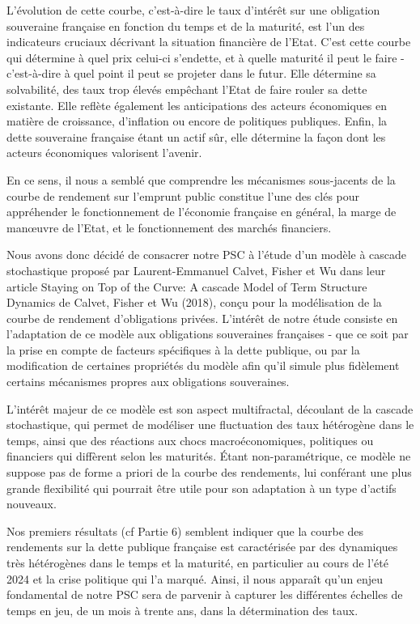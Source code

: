 \documentclass[a4paper]{article}
\begin{document}
L’évolution de cette courbe, c’est-à-dire le taux d’intérêt sur une obligation souveraine française en fonction du temps et de la maturité, est l’un des indicateurs cruciaux décrivant la situation financière de l’Etat. C’est cette courbe qui détermine à quel prix celui-ci s’endette, et à quelle maturité il peut le faire - c’est-à-dire à quel point il peut se projeter dans le futur. Elle détermine sa solvabilité, des taux trop élevés empêchant l’Etat de faire rouler sa dette existante. Elle reflète également les anticipations des acteurs économiques en matière de croissance, d’inflation ou encore de politiques publiques. Enfin, la dette souveraine française étant un actif sûr, elle détermine la façon dont les acteurs économiques valorisent l’avenir.

En ce sens, il nous a semblé que comprendre les mécanismes sous-jacents de la courbe de rendement sur l’emprunt public constitue l’une des clés pour appréhender le fonctionnement de l’économie française en général, la marge de manœuvre de l’Etat, et le fonctionnement des marchés financiers. 

Nous avons donc décidé de consacrer notre PSC à l’étude d’un modèle à cascade stochastique proposé par Laurent-Emmanuel Calvet, Fisher et Wu dans leur article Staying on Top of the Curve: A cascade Model of Term Structure Dynamics de Calvet, Fisher et Wu (2018), conçu pour la modélisation de la courbe de rendement d'obligations privées. L’intérêt de notre étude consiste en l’adaptation de ce modèle aux obligations souveraines françaises - que ce soit par la prise en compte de facteurs spécifiques à la dette publique, ou par la modification de certaines propriétés du modèle afin qu’il simule plus fidèlement certains mécanismes propres aux obligations souveraines.

L’intérêt majeur de ce modèle est son aspect multifractal, découlant de la cascade stochastique, qui permet de modéliser une fluctuation des taux hétérogène dans le temps, ainsi que des réactions aux chocs macroéconomiques, politiques ou financiers qui diffèrent selon les maturités. Étant non-paramétrique, ce modèle ne suppose pas de forme a priori de la courbe des rendements, lui conférant une plus grande flexibilité qui pourrait être utile pour son adaptation à un type d’actifs nouveaux.

Nos premiers résultats (cf Partie 6) semblent indiquer que la courbe des rendements sur la dette publique française est caractérisée par des dynamiques très hétérogènes dans le temps et la maturité, en particulier au cours de l’été 2024 et la crise politique qui l’a marqué. Ainsi, il nous apparaît qu’un enjeu fondamental de notre PSC sera de parvenir à capturer les différentes échelles de temps en jeu, de un mois à trente ans, dans la détermination des taux.
\end{document}
